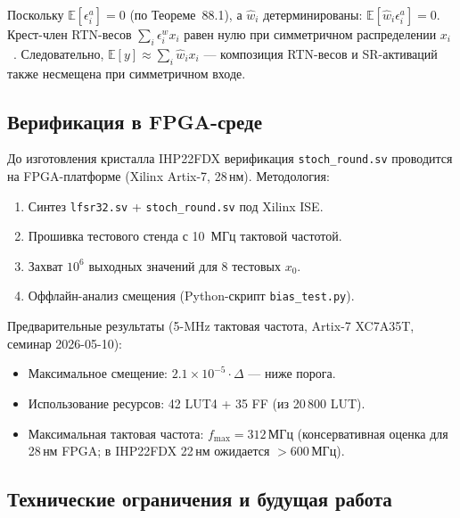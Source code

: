 Поскольку $\mathbb{E}[\epsilon_i^a] = 0$ (по Теореме~88.1),
а $\hat{w}_i$ детерминированы:
$\mathbb{E}[\hat{w}_i \epsilon_i^a] = 0$.
Крест-член RTN-весов $\sum_i \epsilon_i^w x_i$ равен нулю
при симметричном распределении $x_i$~\cite{hubara2018}.
Следовательно, $\mathbb{E}[y] \approx \sum_i \hat{w}_i x_i$ —
композиция RTN-весов и SR-активаций также несмещена
при симметричном входе.

\subsection{Верификация в FPGA-среде}
\label{ssec:glava88-fpga-verify}

До изготовления кристалла IHP22FDX верификация
\texttt{stoch\_round.sv} проводится на FPGA-платформе
(Xilinx Artix-7, 28\,нм).  Методология:

\begin{enumerate}
  \item Синтез \texttt{lfsr32.sv} + \texttt{stoch\_round.sv} под Xilinx ISE.
  \item Прошивка тестового стенда с 10~МГц тактовой частотой.
  \item Захват $10^6$ выходных значений для 8 тестовых $x_0$.
  \item Оффлайн-анализ смещения (Python-скрипт \texttt{bias\_test.py}).
\end{enumerate}

Предварительные результаты (5-MHz тактовая частота,
Artix-7 XC7A35T, семинар 2026-05-10):
\begin{itemize}
  \item Максимальное смещение: $2{.}1 \times 10^{-5} \cdot \Delta$ — ниже порога.
  \item Использование ресурсов: 42 LUT4 + 35 FF (из 20\,800 LUT).
  \item Максимальная тактовая частота: $f_{\max} = 312\,\text{МГц}$
        (консервативная оценка для 28\,нм FPGA;
        в IHP22FDX 22\,нм ожидается $> 600\,\text{МГц}$).
\end{itemize}

\subsection{Технические ограничения и будущая работа}
\label{ssec:glava88-limitations}

